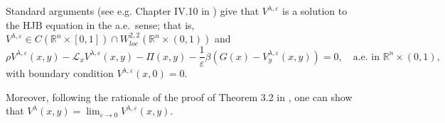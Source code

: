 \documentclass[11pt]{amsart}
\theoremstyle{plain}
\def \R{\mathbb{R}}
\numberwithin{equation}{section}
\begin{document}
Standard arguments (see e.g. Chapter IV.10 in \cite{fleming.soner2006}) give that $V^{\lambda, \varepsilon}$ is a  solution  to the HJB equation in the a.e.\ sense; that is, $V^{\lambda, \varepsilon} \in C (\R^n \times [0,1]) \cap W_{loc}^{2, 2} \left(\mathbb{R}^{n} \times (0,1) \right)$ and
\begin{equation}\label{eq HJB penalized}
\rho V^{\lambda, \varepsilon}(x, y)-\mathcal{L}_{x} V^{\lambda, \varepsilon}(x, y)-\Pi(x, y)-\frac 1 {\varepsilon} \beta\left(G(x)-V_{y}^{\lambda, \varepsilon}(x, y)\right)=0,  \quad \text{a.e.\ in $\mathbb R ^n \times (0,1),$}
\end{equation}
with boundary condition $V^{\lambda, \varepsilon}(x,0)=0$.

Moreover, following the rationale of  the proof of Theorem 3.2 in \cite{williams.chow.menaldi.1994regularity}, one can show that
$V^\lambda (x, y)=\lim _{\varepsilon \rightarrow 0} V^{\lambda, \varepsilon}(x,y)$. 
\end{document}
